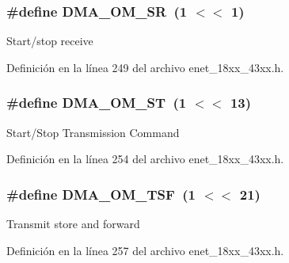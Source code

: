 \subsubsection[{\texorpdfstring{D\+M\+A\+\_\+\+O\+M\+\_\+\+SR}{DMA_OM_SR}}]{\setlength{\rightskip}{0pt plus 5cm}\#define D\+M\+A\+\_\+\+O\+M\+\_\+\+SR~(1 $<$$<$ 1)}\hypertarget{group___e_n_e_t__18_x_x__43_x_x_gab99f651bd4d439e29cdd810076f54895}{}\label{group___e_n_e_t__18_x_x__43_x_x_gab99f651bd4d439e29cdd810076f54895}
Start/stop receive 

Definición en la línea 249 del archivo enet\+\_\+18xx\+\_\+43xx.\+h.

\subsubsection[{\texorpdfstring{D\+M\+A\+\_\+\+O\+M\+\_\+\+ST}{DMA_OM_ST}}]{\setlength{\rightskip}{0pt plus 5cm}\#define D\+M\+A\+\_\+\+O\+M\+\_\+\+ST~(1 $<$$<$ 13)}\hypertarget{group___e_n_e_t__18_x_x__43_x_x_ga947c7d4120a02d447a1ae1dd3c7b73e4}{}\label{group___e_n_e_t__18_x_x__43_x_x_ga947c7d4120a02d447a1ae1dd3c7b73e4}
Start/\+Stop Transmission Command 

Definición en la línea 254 del archivo enet\+\_\+18xx\+\_\+43xx.\+h.

\subsubsection[{\texorpdfstring{D\+M\+A\+\_\+\+O\+M\+\_\+\+T\+SF}{DMA_OM_TSF}}]{\setlength{\rightskip}{0pt plus 5cm}\#define D\+M\+A\+\_\+\+O\+M\+\_\+\+T\+SF~(1 $<$$<$ 21)}\hypertarget{group___e_n_e_t__18_x_x__43_x_x_ga5ac9f54cadc94a691f91476b761b0223}{}\label{group___e_n_e_t__18_x_x__43_x_x_ga5ac9f54cadc94a691f91476b761b0223}
Transmit store and forward 

Definición en la línea 257 del archivo enet\+\_\+18xx\+\_\+43xx.\+h.

